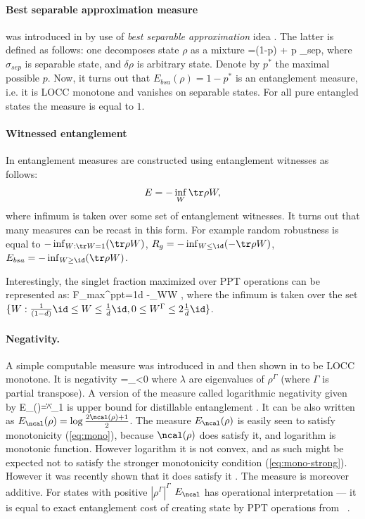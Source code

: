 \documentclass[rmp,12pt,preprint]{revtex4-2}
\begin{document}
\paragraph{Best separable approximation measure} was introduced in
\cite{KarnasL2000-bsa} by use of {\it best separable approximation} idea
 \cite{LewensteinSanpera-bsa}. The latter is defined as follows: one  decomposes
state $\rho$  as a mixture
\be
\rho=(1-p) \delta \rho + p \sigma_{sep},
\ee
where $\sigma_{sep}$ is separable state, and $\delta\rho$ is arbitrary state.
Denote by $p^*$ the maximal possible $p$.
Now, it turns out that $E_{bsa}(\rho)=1-p^*$ is an entanglement
measure, i.e. it is LOCC monotone  and vanishes on separable states.
For all pure entangled states the measure is equal to $1$.

\paragraph{Witnessed entanglement}
In \cite{BrandaoV,Brandao2005-witent} entanglement
measures are constructed using entanglement witnesses  as follows:
\begin{equation} E=-\inf_W \tr \rho W, \end{equation} where infimum is taken over some set of
entanglement witnesses. It turns out that many measures can be
recast in this form. For example random robustness is equal
to $-\inf_{W: \tr W=1} (\tr \rho W)$, $R_g=-\inf_{W\leq \id}(-\tr \rho
W)$, $E_{bsa}=-\inf_{W\geq \id} (\tr \rho W)$.

Interestingly, the singlet fraction maximized over PPT operations \cite{Rains2001} can be represented as:
\be
F_{max}^{ppt}={1\over d} -\inf_{W}\tr W \rho,
\ee
where the infimum is taken over the set $\{W: {1\over (1-d)}\id\leq W \leq {1\over d}\id,0\leq W^\Gamma
\leq 2 {1\over d}\id\}$.


\paragraph{Negativity.} A simple computable measure was introduced in
\cite{ZyczkowskiHSP-vol} and then shown in \cite{Vidal-Werner} to be
LOCC monotone. It is negativity
\be
\ncal=\sum_{\lambda<0}\lambda
\ee
where $\lambda$ are eigenvalues of $\rho^\Gamma$ (where $\Gamma$ is
partial transpose). A version of the measure called logarithmic
negativity given by
\be
E_\ncal(\rho)=\log \|\rho^\Gamma\|_1
\ee
is upper bound for distillable entanglement \cite{Vidal-Werner}. It can be also written as $E_\ncal(\rho)= \log {2\ncal(\rho) +1\over 2}$.
The measure $E_\ncal(\rho)$ is easily seen to satisfy monotonicity
(\ref{eq:mono}), because $\ncal(\rho)$ does satisfy it, and
logarithm is monotonic function. However logarithm it is
not convex, and as such might be expected not to satisfy the
stronger monotonicity condition (\ref{eq:mono-strong}). However it
was recently shown that it does satisfy it \cite{Plenio2005-logneg}.
The measure is moreover additive. For states with positive $|\rho^\Gamma|^\Gamma$
$E_\ncal$ has operational interpretation --- it is equal to
exact entanglement cost of creating state by PPT operations from \singlets\
\cite{AudenaertPE2002-PPT}.
\end{document}
